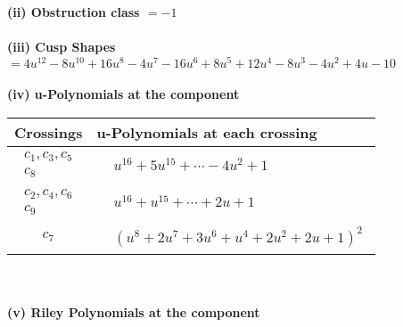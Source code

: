 \documentclass[1p]{elsarticle_modified}
\theoremstyle{definition}
\begin{document}
\flushleft \textbf{(ii) Obstruction class $= -1$}\\~\\
\flushleft \textbf{(iii) Cusp Shapes $= 4 u^{12}-8 u^{10}+16 u^8-4 u^7-16 u^6+8 u^5+12 u^4-8 u^3-4 u^2+4 u-10$}\\~\\
\newpage\renewcommand{\arraystretch}{1}
\flushleft \textbf{(iv) u-Polynomials at the component}\newline \\
\begin{tabular}{m{50pt}|m{274pt}}
Crossings & \hspace{64pt}u-Polynomials at each crossing \\
\hline $$\begin{aligned}c_{1},c_{3},c_{5}\\c_{8}\end{aligned}$$&$\begin{aligned}
&u^{16}+5 u^{15}+\cdots-4 u^2+1
\end{aligned}$\\
\hline $$\begin{aligned}c_{2},c_{4},c_{6}\\c_{9}\end{aligned}$$&$\begin{aligned}
&u^{16}+u^{15}+\cdots+2 u+1
\end{aligned}$\\
\hline $$\begin{aligned}c_{7}\end{aligned}$$&$\begin{aligned}
&(u^8+2 u^7+3 u^6+u^4+2 u^2+2 u+1)^2
\end{aligned}$\\
\hline
\end{tabular}\\~\\
\newpage\renewcommand{\arraystretch}{1}
\flushleft \textbf{(v) Riley Polynomials at the component}\newline \\
\end{document}
